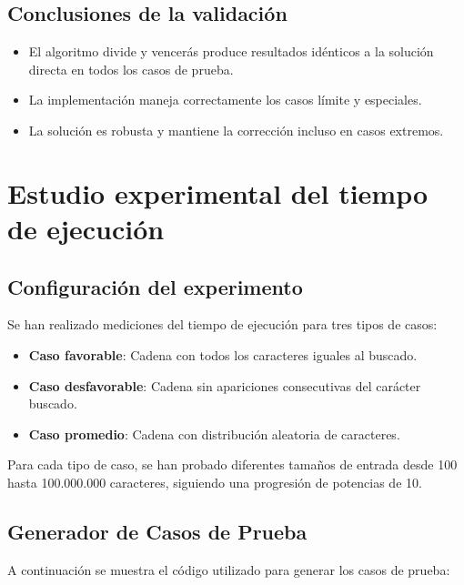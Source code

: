 \documentclass[12pt,a4paper]{article}
\begin{document}
\subsection{Conclusiones de la validación}
\begin{itemize}
    \item El algoritmo divide y vencerás produce resultados idénticos a la solución directa en todos los casos de prueba.
    \item La implementación maneja correctamente los casos límite y especiales.
    \item La solución es robusta y mantiene la corrección incluso en casos extremos.
\end{itemize}

\section{Estudio experimental del tiempo de ejecución}

\subsection{Configuración del experimento}
Se han realizado mediciones del tiempo de ejecución para tres tipos de casos:
\begin{itemize}
    \item \textbf{Caso favorable}: Cadena con todos los caracteres iguales al buscado.
    \item \textbf{Caso desfavorable}: Cadena sin apariciones consecutivas del carácter buscado.
    \item \textbf{Caso promedio}: Cadena con distribución aleatoria de caracteres.
\end{itemize}
Para cada tipo de caso, se han probado diferentes tamaños de entrada desde 100 hasta 100.000.000 caracteres, siguiendo una progresión de potencias de 10.

\subsection{Generador de Casos de Prueba}
A continuación se muestra el código utilizado para generar los casos de prueba:
\end{document}

